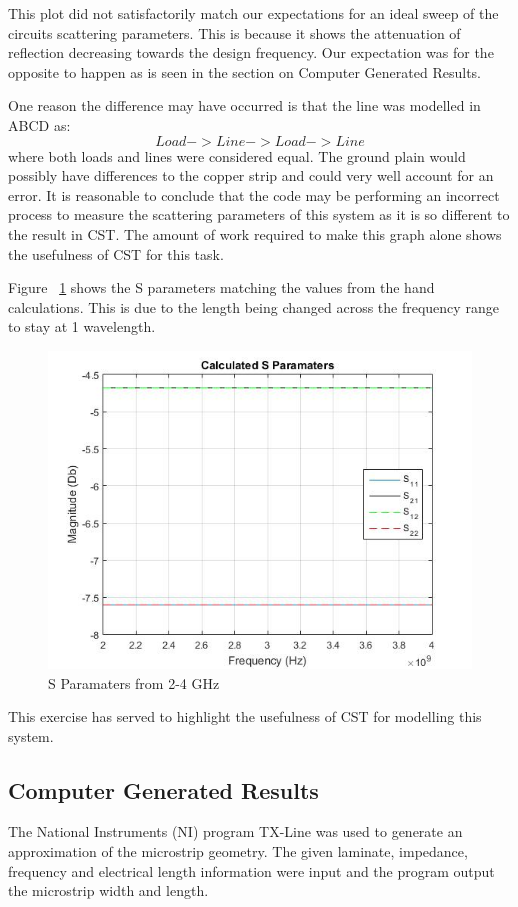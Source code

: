 \documentclass{paper}
\begin{document}
This plot did not satisfactorily match our expectations for an ideal sweep of the circuits scattering parameters. This is because it shows the attenuation of reflection decreasing towards the design frequency. Our expectation was for the opposite to happen as is seen in the section on Computer Generated Results.

One reason the difference may have occurred is that the line was modelled in ABCD as:
$$Load->Line->Load->Line$$
where both loads and lines were considered equal. The ground plain would possibly have differences to the copper strip and could very well account for an error. It is reasonable to conclude that the code may be performing an incorrect process to measure the scattering parameters of this system as it is so different to the result in CST. The amount of work required to make this graph alone shows the usefulness of CST for this task.

Figure ~\ref{fig:varying_l} shows the S parameters matching the values from the hand calculations. This is due to the length being changed across the frequency range to stay at 1 wavelength.

\begin{figure}[H]
	\centering
	\includegraphics[scale=0.5]{IMG/varying_l}
	\caption{S Paramaters from 2-4 GHz}
	\label{fig:varying_l}
\end{figure}

This exercise has served to highlight the usefulness of CST for modelling this system.


\subsection{Computer Generated Results}
\label{sec:tx-line}
The National Instruments (NI) program TX-Line was used to generate an approximation of the microstrip geometry. The given laminate, impedance, frequency and electrical length information were input and the program output the microstrip width and length. \\
\end{document}
